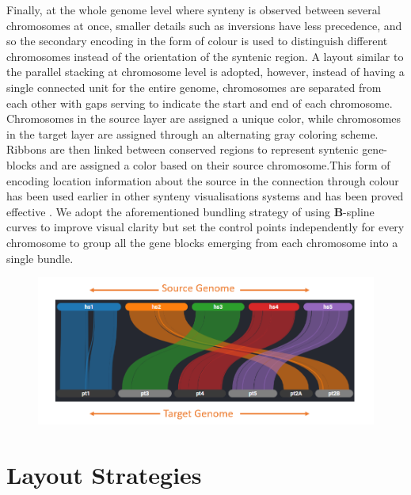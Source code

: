 Finally, at the whole genome level where synteny is observed between several chromosomes at once, smaller details such as inversions have less precedence, and so the secondary encoding in the form of colour is used to distinguish different chromosomes instead of the orientation of the syntenic region. A layout similar to the parallel stacking at chromosome level is adopted, however, instead of having a single connected unit for the entire genome, chromosomes are separated from each other with gaps serving to indicate the start and end of each chromosome. Chromosomes in the source layer are assigned a unique color, while chromosomes in the target layer are assigned through an alternating gray coloring scheme. Ribbons are then linked between conserved regions to represent syntenic gene-blocks and are assigned a color based on their source chromosome.This form of encoding location information about the source in the connection through colour has been used earlier in other synteny visualisations systems and has been proved effective \cite{Meyer2009}. We adopt the aforementioned bundling strategy of using \textbf{B}-spline curves\cite{ref851370272} to improve visual clarity but set the control points independently for every chromosome to group all the gene blocks emerging from each chromosome into a single bundle.


\begin{figure}[ht]
  \centering
  \includegraphics[width=.75\linewidth]{images/ch_4_genome_level.PNG}
  \label{fig:ch_4_genome_level}
\end{figure}



\section{Layout Strategies}


